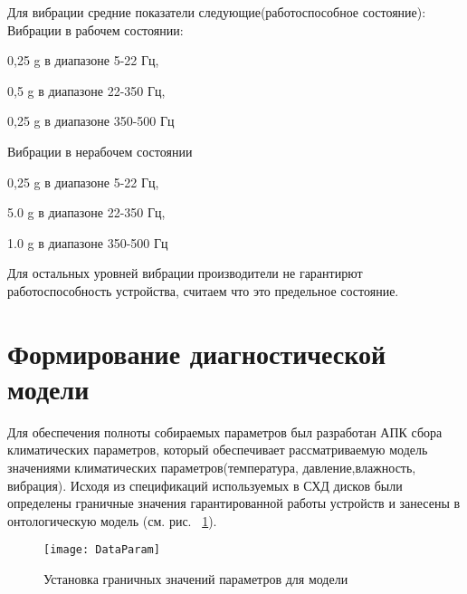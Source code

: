 Для вибрации средние показатели следующие(работоспособное состояние):
Вибрации в рабочем состоянии:
\begin{itemize*}
	\item{0,25 g в диапазоне 5-22 Гц, }
	\item{0,5 g в диапазоне 22-350 Гц,}
	\item{0,25 g в диапазоне 350-500 Гц}
\end{itemize*}
Вибрации в нерабочем состоянии
\begin{itemize*}
	\item{0,25 g в диапазоне 5-22 Гц,}
	\item{5.0  g в диапазоне 22-350 Гц,}
	\item{1.0  g в диапазоне 350-500 Гц}
\end{itemize*}
Для остальных уровней вибрации производители не гарантирют работоспособность устройства, считаем что это предельное состояние.
\section{Формирование диагностической модели}
Для обеспечения полноты собираемых параметров был разработан АПК сбора климатических параметров, который обеспечивает рассматриваемую модель значениями климатических параметров(температура, давление,влажность, вибрация). Исходя из спецификаций используемых в СХД дисков были определены граничные значения гарантированной работы устройств и занесены в онтологическую модель (см. рис. ~\ref{fig:DataParam}). 

\begin{figure}[h]
	\centering
	\texttt{[image: DataParam]}
	\caption{Установка граничных значений параметров для модели}
	\label{fig:DataParam}
\end{figure}